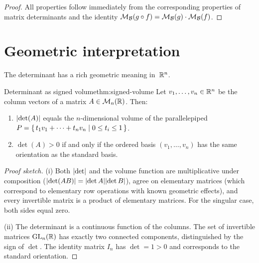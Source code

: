 \begin{proof}
All properties follow immediately from the corresponding properties
of matrix determinants and the identity
$\mathcal{M}_{\mathcal{B}}(g\circ f)=\mathcal{M}_{\mathcal{B}}(g)\cdot\mathcal{M}_{\mathcal{B}}(f)$.
\end{proof}


\section{Geometric interpretation}\label{sec:det-geometry}

The determinant has a rich geometric meaning in~${\mathbb{R}}^n$.

\begin{theorem}{Determinant as signed volume}{thm:signed-volume}
Let $v_1,\ldots,v_n\in{\mathbb{R}}^n$ be the column vectors of a matrix
$A\in\mathcal{M}_n({\mathbb{R}})$. Then:
\begin{enumerate}[label=(\roman*)]
  \item $\lvert\det(A)\rvert$ equals the $n$-dimensional volume of the
    parallelepiped
    $P = \left\{\,t_1 v_1+\cdots+t_n v_n\;\middle|\;0\leq t_i\leq 1\,\right\}$.
  \item $\det(A)>0$ if and only if the ordered basis
    $(v_1,\ldots,v_n)$ has the same orientation as the standard basis.
\end{enumerate}
\end{theorem}

\begin{proof}[Proof sketch]
(i) Both $\lvert\det\rvert$ and the volume function are multiplicative
under composition ($\lvert\det(AB)\rvert=\lvert\det A\rvert\lvert\det B\rvert$), agree
on elementary matrices (which correspond to elementary row
operations with known geometric effects), and every invertible matrix
is a product of elementary matrices. For the singular case, both
sides equal zero.

(ii) The determinant is a continuous function of the columns.
The set of invertible matrices $\operatorname{GL}_n({\mathbb{R}})$ has exactly two connected
components, distinguished by the sign of $\det$. The identity matrix
$I_n$ has $\det=1>0$ and corresponds to the standard orientation.
\end{proof}


